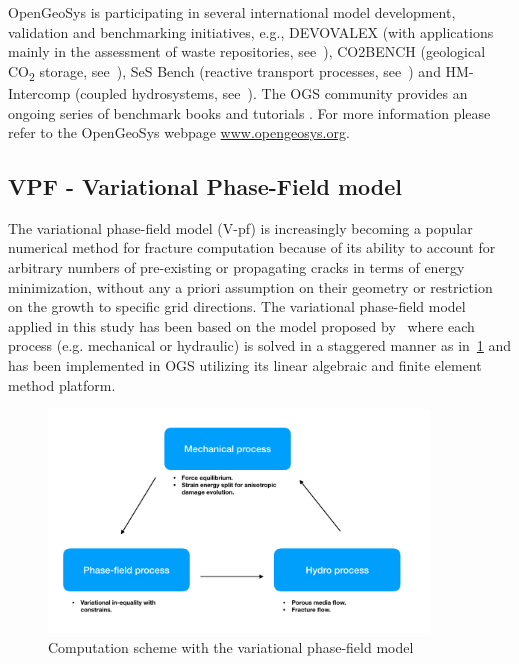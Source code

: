 OpenGeoSys is participating in several international model development, validation and benchmarking initiatives, e.g., DEVOVALEX (with applications mainly in the assessment of waste repositories, see~\cite{Birkholzer2018}), CO2BENCH (geological CO\textsubscript{2} storage, see~\cite{Kolditz2012613}), SeS Bench (reactive transport processes, see~\cite{Steefel:2015}) and HM-Intercomp (coupled hydrosystems, see~\cite{Maxwell:2015}).
%
The OGS community provides an ongoing series of benchmark books \cite{BB4} and tutorials \cite{Lehmann:2018}. For more information please refer to the OpenGeoSys webpage \url{www.opengeosys.org}.

\subsection*{VPF - Variational Phase-Field model}

The variational phase-field model (V-pf) is increasingly becoming a popular numerical method for fracture computation because of its ability to account for arbitrary numbers of pre-existing or propagating cracks in terms of energy minimization, without any a priori assumption on their geometry or restriction on the growth to specific grid directions.
The variational phase-field model applied in this study has been based on the model proposed by~\cite{Bourdin2012, Chukwudozie2019} where each process (e.g. mechanical or hydraulic) is solved in a staggered manner as in~\ref{fig:Keita_VPF_code} and has been implemented in OGS utilizing its linear algebraic and finite element method platform.

\begin{figure}[!ht]
\centering
\includegraphics[width=0.9\textwidth]{figures/VPF_code.png}
\caption{Computation scheme with the variational phase-field model}
\label{fig:Keita_VPF_code}
\end{figure} 

